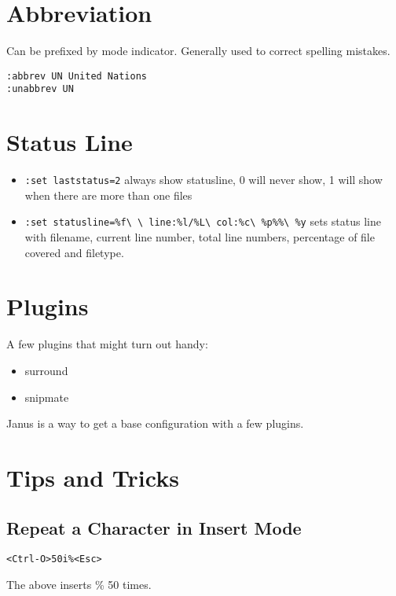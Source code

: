 \documentclass[a4paper, 12pt]{article}
\begin{document}
\section{Abbreviation}
Can be prefixed by mode indicator. Generally used to correct spelling mistakes.
\begin{verbatim}
:abbrev UN United Nations
:unabbrev UN
\end{verbatim}

\section{Status Line}
\begin{itemize}
	\item \verb|:set laststatus=2| always show statusline, 0 will never show, 1 will show when there are more than one files	
	\item \verb|:set statusline=%f\ \ line:%l/%L\ col:%c\ %p%%\ %y| sets status line with filename, current line number, total line numbers, percentage of file covered and filetype.
\end{itemize}

\section{Plugins}
A few plugins that might turn out handy:
\begin{itemize}
	\item surround	
	\item snipmate
\end{itemize}
Janus is a way to get a base configuration with a few plugins.

\section{Tips and Tricks}
\subsection{Repeat a Character in Insert Mode}
\begin{verbatim}
<Ctrl-O>50i%<Esc>
\end{verbatim}
The above inserts \% 50 times.
\end{document}
